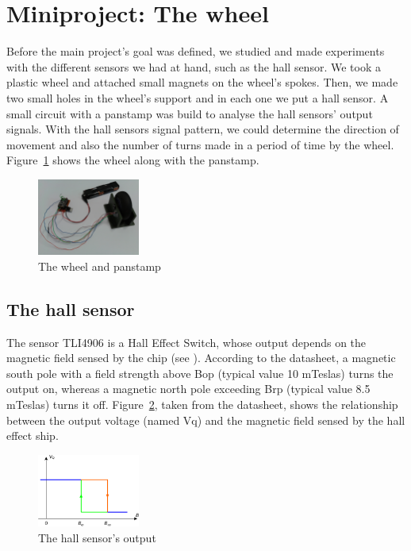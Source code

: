 \section{Miniproject: The wheel}
\label{sec:the-wheel}
Before the main project's goal was defined, we studied and made experiments with the different sensors we had at hand, such as the hall sensor. We took a plastic wheel and attached small magnets on the wheel's spokes. Then, we made two small holes in the wheel's support and in each one we put a hall sensor. A small circuit with a panstamp was build to analyse the hall sensors' output signals. With the hall sensors signal pattern, we could determine the direction of movement and also the number of turns made in a period of time by the wheel. Figure~\ref{fig:wheel} shows the wheel along with the panstamp. 


\begin{figure}[h!]
 \centering
 \includegraphics[width= 0.3\textwidth, clip=true  ,keepaspectratio=true]{./pic/wheel.jpg}
 \caption{The wheel and panstamp}
 \label{fig:wheel}
\end{figure}


\subsection{The hall sensor}
The sensor TLI4906 is a Hall Effect Switch, whose output depends on the magnetic field sensed by the chip (see  ). According to the datasheet, a magnetic south pole with a field strength above Bop (typical value 10 mTeslas) turns the output on, whereas a magnetic north pole exceeding Brp (typical value 8.5 mTeslas) turns it off. Figure~\ref{fig:hall-sensor-output}, taken from the datasheet, shows the relationship between the output voltage (named Vq) and the magnetic field sensed by the hall effect ship.

\begin{figure}[h!]
 \centering
 \includegraphics[width= 0.3\textwidth, clip=true  ,keepaspectratio=true]{./graph/hall-sensor-output.png}
 \caption{The hall sensor's output}
 \label{fig:hall-sensor-output}
\end{figure}

